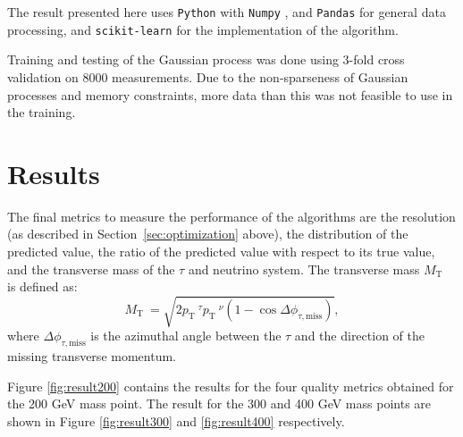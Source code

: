 \documentclass[twocolumn]{scrartcl}
\newcommand{\pt}{\ensuremath{p_\text{T}}~}
\newcommand{\mt}{\ensuremath{M_\text{T}}~}
\begin{document}
The result presented here uses \texttt{Python} with \texttt{Numpy} \cite{numpy}, and \texttt{Pandas} \cite{pandas} for general data processing, and \texttt{scikit-learn} \cite{scikit-learn} for the implementation of the algorithm.

Training and testing of the Gaussian process was done using 3-fold cross validation on 8000 measurements. Due to the non-sparseness of Gaussian processes and memory constraints, more data than this was not feasible to use in the training.
\section{Results}
\label{sec:results}

The final metrics to measure the performance of the algorithms are the resolution (as described in Section~\ref{sec:optimization} above), the distribution of the predicted value, the ratio of the predicted value with respect to its true value, and the transverse mass of the $τ$ and neutrino system. The transverse mass $\mt$ is defined as:
\begin{equation}
  \label{eq:mt}
  \mt=\sqrt{ 2 \pt^\tau \pt^\nu   (1-\cos \Delta\phi_{\tau,\text{miss}}) },
\end{equation}
where $\Delta\phi_{\tau,\text{miss}}$ is the azimuthal angle between the $\tau$ and the direction of the missing transverse momentum. 

Figure \ref{fig:result200} contains the results for the four quality metrics obtained for the 200 GeV mass point. The result for the 300 and 400 GeV mass points are shown in Figure \ref{fig:result300} and \ref{fig:result400} respectively.
\end{document}
